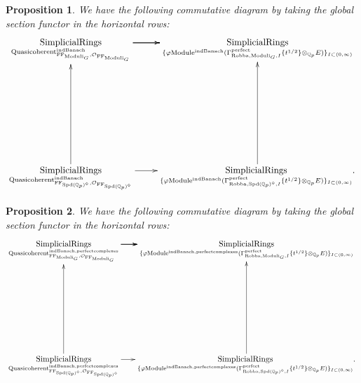 \documentclass[12pt]{book}
\newtheorem{proposition}{Proposition}
\theoremstyle{definition}
\begin{document}
\begin{proposition}
We have the following commutative diagram by taking the global section functor in the horizontal rows:
\[\displayindent=+0in
\xymatrix@R+7pc{
\underset{\mathrm{Quasicoherent}^{\mathrm{indBanach}}_{\mathrm{FF}_{\mathrm{Moduli}_G},\mathcal{O}_{\mathrm{FF}_{\mathrm{Moduli}_G}}}}{\mathrm{SimplicialRings}}  \ar[r] \ar[r] \ar[r] &\underset{\{\varphi\mathrm{Module}^{\mathrm{indBanach}}(\Gamma^\text{perfect}_{\text{Robba},{\mathrm{Moduli}_G},I}\{t^{1/2}\}\otimes_{\mathbb{Q}_p}E)\}_{I\subset (0,\infty)}}{\mathrm{SimplicialRings}}   \\
\underset{\mathrm{Quasicoherent}^{\mathrm{indBanach}}_{\mathrm{FF}_{\mathrm{Spd}(\mathbb{Q}_p)^\diamond},\mathcal{O}_{\mathrm{FF}_{\mathrm{Spd}(\mathbb{Q}_p)^\diamond}}}}{\mathrm{SimplicialRings}} \ar[u]\ar[r] &\underset{\{\varphi\mathrm{Module}^\text{indBanach}(\Gamma^\text{perfect}_{\text{Robba},{\mathrm{Spd}(\mathbb{Q}_p)^\diamond},I}\{t^{1/2}\}\otimes_{\mathbb{Q}_p}E)\}_{I\subset (0,\infty)}}{\mathrm{SimplicialRings}}.\ar[u]  
}
\]
\end{proposition}

\begin{proposition}
We have the following commutative diagram by taking the global section functor in the horizontal rows:
\[\displayindent=+0in
\xymatrix@C-0.1in@R+7pc{
\underset{\mathrm{Quasicoherent}^{\mathrm{indBanach,perfectcomplexes}}_{\mathrm{FF}_{\mathrm{Moduli}_G},\mathcal{O}_{\mathrm{FF}_{\mathrm{Moduli}_G}}}}{\mathrm{SimplicialRings}}  \ar[r] \ar[r] \ar[r] &\underset{\{\varphi\mathrm{Module}^{\mathrm{indBanach,perfectcomplexes}}(\Gamma^\text{perfect}_{\text{Robba},{\mathrm{Moduli}_G},I}\{t^{1/2}\}\otimes_{\mathbb{Q}_p}E)\}_{I\subset (0,\infty)}}{\mathrm{SimplicialRings}}   \\
\underset{\mathrm{Quasicoherent}^{\mathrm{indBanach,perfectcomplexes}}_{\mathrm{FF}_{\mathrm{Spd}(\mathbb{Q}_p)^\diamond},\mathcal{O}_{\mathrm{FF}_{\mathrm{Spd}(\mathbb{Q}_p)^\diamond}}}}{\mathrm{SimplicialRings}} \ar[u]\ar[r] &\underset{\{\varphi\mathrm{Module}^{\mathrm{indBanach,perfectcomplexes}}(\Gamma^\text{perfect}_{\text{Robba},{\mathrm{Spd}(\mathbb{Q}_p)^\diamond},I}\{t^{1/2}\}\otimes_{\mathbb{Q}_p}E)\}_{I\subset (0,\infty)}}{\mathrm{SimplicialRings}}.\ar[u]  
}
\]

\end{proposition}
\end{document}
